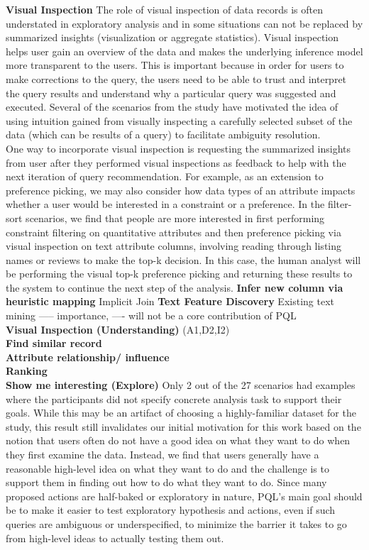 \documentclass{sig-alternate-05-2015}
\begin{document}
\textbf{Visual Inspection}
The role of visual inspection of data records is often understated in exploratory analysis and in some situations can not be replaced by summarized insights (visualization or aggregate statistics). Visual inspection helps user gain an overview of the data and makes the underlying inference model more transparent to the users. This is important because in order for users to make corrections to the query, the users need to be able to trust and interpret the query results and understand why a particular query was suggested and executed. Several of the scenarios from the study have motivated the idea of using intuition gained from visually inspecting a carefully selected subset of the data (which can be results of a query) to facilitate ambiguity resolution. 
\\ One way to incorporate visual inspection is requesting the summarized insights from user after they performed visual inspections as feedback to help with the next iteration of query recommendation. For example, as an extension to preference picking, we may also consider how data types of an attribute impacts whether a user would be interested in a constraint or a preference. In the filter-sort scenarios, we find that people are more interested in first performing constraint filtering on quantitative attributes and then preference picking via visual inspection on text attribute columns, involving reading through listing names or reviews to make the top-k decision. In this case, the human analyst will be performing the visual top-k preference picking and returning these results to the system to continue the next step of the analysis.
\textbf{Infer new column via heuristic mapping}
Implicit Join
\textbf{Text Feature Discovery}
Existing text mining ----- importance, ---- will not be a core contribution of PQL 
\\ \textbf{Visual Inspection (Understanding)} (A1,D2,I2)
\\ \textbf{Find similar record}
\\ \textbf{Attribute relationship/ influence}
\\ \textbf{Ranking}
\\ \textbf{Show me interesting (Explore)}
Only 2 out of the 27 scenarios had examples where the participants did not specify concrete analysis task to support their goals. While this may be an artifact of choosing a highly-familiar dataset for the study, this result still invalidates our initial motivation for this work based on the notion that users often do not have a good idea on what they want to do when they first examine the data. Instead, we find that users generally have a reasonable high-level idea on what they want to do and the challenge is to support them in finding out how to do what they want to do. Since many proposed actions are half-baked or exploratory in nature, PQL's main goal should be to make it easier to test exploratory hypothesis and actions, even if such queries are ambiguous or underspecified, to minimize the barrier it takes to go from high-level ideas to actually testing them out.
\end{document}
